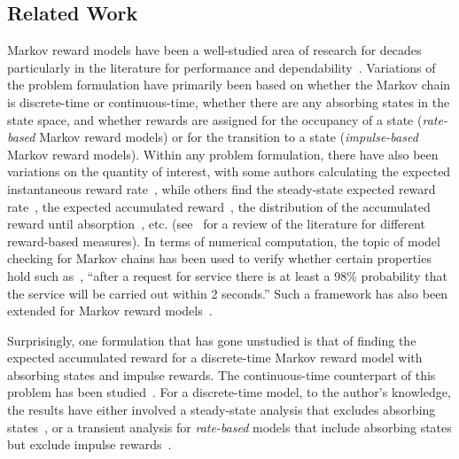 \subsection{Related Work}

Markov reward models have been a well-studied area of research for decades~\cite{howard1971dynamicv2} particularly in the literature for performance and dependability~\cite{Trivedi93, Muppala96, Blake1988,GayKetelsen1979,Beaudry78}.  Variations of the problem formulation have primarily been based on whether the Markov chain is discrete-time or continuous-time, whether there are any absorbing states in the state space, and whether rewards are assigned for the occupancy of a state (\emph{rate-based} Markov reward models) or for the transition to a state (\emph{impulse-based} Markov reward models).  Within any problem formulation, there have also been variations on the quantity of interest, with some authors calculating the expected instantaneous reward rate~\cite{Blake1988}, while others find the steady-state expected reward rate~\cite{GayKetelsen1979}, the expected accumulated reward~\cite{Blake1988}, the distribution of the accumulated reward until absorption~\cite{Beaudry78}, etc. (see~\cite{Trivedi93} for a review of the literature for different reward-based measures).  In terms of numerical computation, the topic of model checking for Markov chains has been used to verify whether certain properties hold such as~\cite{HanssonJonsson94}, ``after a request for service there is at least a 98\% probability that the service will be carried out within 2 seconds.''  Such a framework has also been extended for Markov reward models~\cite{KKZ05}.


Surprisingly, one formulation that has gone unstudied is that of finding the expected accumulated reward for a discrete-time Markov reward model with absorbing states and impulse rewards.  The continuous-time counterpart of this problem has been studied~\cite{Trivedi93}.  For a discrete-time model, to the author's knowledge, the results have either involved a steady-state analysis that excludes absorbing states~\cite{howard1971dynamicv2}, or a transient analysis for \emph{rate-based} models that include absorbing states but exclude impulse rewards~\cite{howard1971dynamicv2}.  

